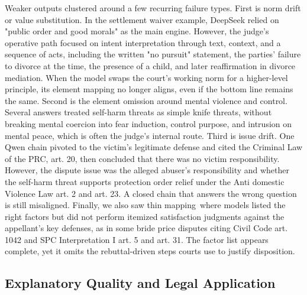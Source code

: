 \documentclass[pdflatex,sn-mathphys-ay]{sn-jnl}%
\theoremstyle{thmstyleone}%
\theoremstyle{thmstyletwo}%
\theoremstyle{thmstylethree}%
\begin{document}
Weaker outputs clustered around a few recurring failure types. First is norm drift or value substitution. In the settlement waiver example, DeepSeek relied on "public order and good morals" as the main engine. However, the judge's operative path focused on intent interpretation through text, context, and a sequence of acts, including the written "no pursuit" statement, the parties' failure to divorce at the time, the presence of a child, and later reaffirmation in divorce mediation. When the model swaps the court's working norm for a higher-level principle, its element mapping no longer aligns, even if the bottom line remains the same. Second is the element omission around mental violence and control. Several answers treated self-harm threats as simple knife threats, without breaking mental coercion into fear induction, control purpose, and intrusion on mental peace, which is often the judge's internal route. Third is issue drift. One Qwen chain pivoted to the victim's legitimate defense and cited the Criminal Law of the PRC, art. 20, then concluded that there was no victim responsibility. However, the dispute issue was the alleged abuser's responsibility and whether the self-harm threat supports protection order relief under the Anti domestic Violence Law art. 2 and art. 23. A closed chain that answers the wrong question is still misaligned. Finally, we also saw thin mapping~where models listed the right factors but did not perform itemized satisfaction judgments against the appellant's key defenses, as in some bride price disputes citing Civil Code art. 1042 and SPC Interpretation I art. 5 and art. 31. The factor list appears complete, yet it omits the rebuttal-driven steps courts use to justify disposition.

\subsection{Explanatory Quality and Legal Application}\label{subsec5}
\end{document}
